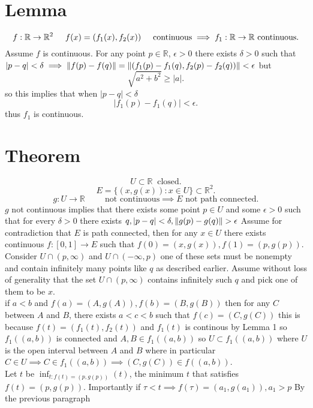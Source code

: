 \documentclass[11pt]{article}
\DeclarePairedDelimiter{\norm}{\lVert}{\rVert}
\begin{document}
\section{Lemma}
\[
    f: \mathbb{R} \rightarrow \mathbb{R}^2 \hspace{0.5cm} f(x) = (f_1(x),f_2(x)) \hspace{0.5cm} \text{continuous} \implies f_1: \mathbb{R} \rightarrow \mathbb{R} \text{ continuous}
.\] 
Assume $f$ is continuous. For any point $p \in \mathbb{R}$, $\epsilon > 0$ there exists $  \delta > 0$ such that $|p-q| < \delta \implies \norm{f(p) - f(q)} = \norm{(f_1(p)-f_1(q),f_2(p)-f_2(q))} < \epsilon$ but
\[
\sqrt{a^2 + b^2} \ge |a|
.\] 
so this implies that when $|p-q| < \delta$
\[
|f_1(p) - f_1(q)| < \epsilon
.\] 
thus $f_1$ is continuous.


\section{Theorem}
\[
    U \subset \mathbb{R} \;\; \text{closed}
.\] 
\[
    E = \{(x,g(x)): x \in U\} \subset \mathbb{R}^2
.\] 
\[
    g: U \rightarrow \mathbb{R} \hspace{1cm}  \text{not continuous} \implies E \text{ not path connected}
.\] 
$g$ not continuous implies that there exists some point $p \in U$ and some $\epsilon > 0$ such that for every $\delta > 0$ there exists $q, |p-q| < \delta, \norm{g(p)-g(q)} > \epsilon$ 
Assume for contradiction that $E$ is path connected, then for any $x \in U$ there exists continuous  $f: [0,1] \rightarrow E$ such that $f(0) = (x,g(x)), f(1) = (p,g(p))$. Consider
$U \cap (p, \infty)$ and $U \cap (-\infty, p)$ one of these sets must be nonempty and contain infinitely many points like $q$ as described earlier. Assume without loss of generality that the set
$U \cap (p, \infty)$ contains infinitely such $q$ and pick one of them to be $x$.\\

if $a < b$ and $f(a) = (A,g(A)), f(b) = (B,g(B))$  then for any $C$ between $A$ and $B$, there exists  $a < c < b$ such that $f(c) = (C, g(C))$ this is because $f(t) = (f_1(t),f_2(t))$ and $f_1(t)$ is continous by Lemma 1 so  $f_1((a,b))$ is connected and $A,B \in f_1((a,b))$ so $U \subset f_1((a,b))$ where $U$ is the open interval between $A$ and $B$ where in particular $C \in U \implies C \in f_1((a,b)) \implies (C,g(C)) \in f((a,b))$.\\

Let $t$ be $\inf_{t: f(t) = (p,g(p))}(t)$, the minimum $t$ that satisfies $f(t) = (p,g(p))$. Importantly if $\tau < t \implies f(\tau) = (a_1,g(a_1)), a_1 > p$ By the previous paragraph\\
\end{document}
